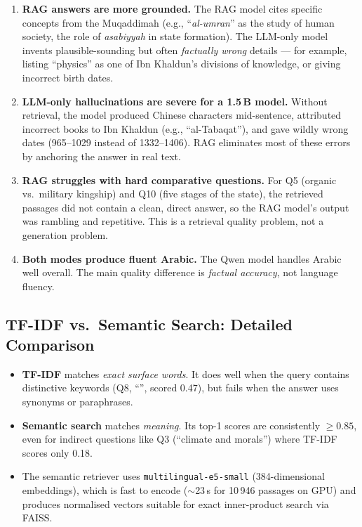 \documentclass[12pt, a4paper]{article}
\newcommand{\arb}[1]{{\arabicfont\RLE{#1}}}
\begin{document}
\begin{enumerate}
    \item \textbf{RAG answers are more grounded.}
          The RAG model cites specific concepts from the Muqaddimah (e.g.,
          ``\emph{al-umran}'' as the study of human society, the role of
          \emph{asabiyyah} in state formation).  The LLM-only model invents
          plausible-sounding but often \emph{factually wrong} details --- for
          example, listing ``physics'' as one of Ibn Khaldun's divisions of
          knowledge, or giving incorrect birth dates.

    \item \textbf{LLM-only hallucinations are severe for a 1.5\,B model.}
          Without retrieval, the model produced Chinese characters mid-sentence,
          attributed incorrect books to Ibn Khaldun (e.g., ``al-Tabaqat''),
          and gave wildly wrong dates (965--1029 instead of 1332--1406).
          RAG eliminates most of these errors by anchoring the answer in
          real text.

    \item \textbf{RAG struggles with hard comparative questions.}
          For Q5 (organic vs.\ military kingship) and Q10 (five stages of the
          state), the retrieved passages did not contain a clean, direct answer,
          so the RAG model's output was rambling and repetitive.  This is a
          retrieval quality problem, not a generation problem.

    \item \textbf{Both modes produce fluent Arabic.}
          The Qwen model handles Arabic well overall.  The main quality
          difference is \emph{factual accuracy}, not language fluency.
\end{enumerate}

\subsection{TF-IDF vs.\ Semantic Search: Detailed Comparison}

\begin{itemize}
    \item \textbf{TF-IDF} matches \emph{exact surface words}.  It does well when
          the query contains distinctive keywords (Q8, ``\arb{المقدمة}'', scored 0.47),
          but fails when the answer uses synonyms or paraphrases.

    \item \textbf{Semantic search} matches \emph{meaning}.  Its top-1 scores are
          consistently $\geq 0.85$, even for indirect questions like Q3
          (``climate and morals'') where TF-IDF scores only 0.18.

    \item The semantic retriever uses \texttt{multilingual-e5-small}
          (384-dimensional embeddings), which is fast to encode ($\sim$23\,s for
          10\,946 passages on GPU) and produces normalised vectors suitable
          for exact inner-product search via FAISS.
\end{itemize}
\end{document}
